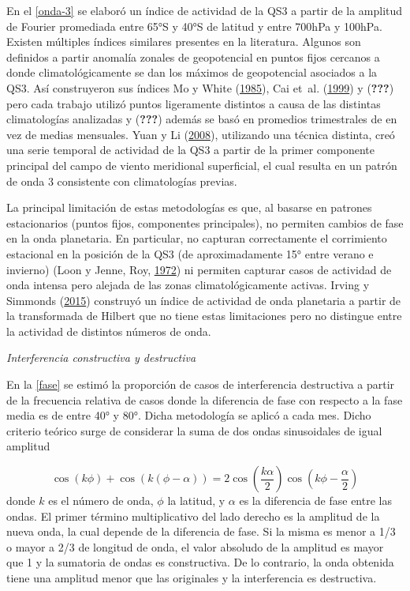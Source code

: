 \documentclass[spanish,a4paper,12pt]{book}
\begin{document}
En el \autoref{onda-3} se elaboró un índice de actividad de la QS3 a
partir de la amplitud de Fourier promediada entre 65°S y 40°S de latitud
y entre 700hPa y 100hPa. Existen múltiples índices similares presentes
en la literatura. Algunos son definidos a partir anomalía zonales de
geopotencial en puntos fijos cercanos a donde climatológicamente se dan
los máximos de geopotencial asociados a la QS3. Así construyeron sus
índices Mo y White (\protect\hyperlink{ref-Mo1985}{1985}), Cai et~al.
(\protect\hyperlink{ref-Cai1999}{1999}) y ({\textbf{???}}) pero cada
trabajo utilizó puntos ligeramente distintos a causa de las distintas
climatologías analizadas y ({\textbf{???}}) además se basó en promedios
trimestrales de en vez de medias mensuales. Yuan y Li
(\protect\hyperlink{ref-Yuan2008}{2008}), utilizando una técnica
distinta, creó una serie temporal de actividad de la QS3 a partir de la
primer componente principal del campo de viento meridional superficial,
el cual resulta en un patrón de onda 3 consistente con climatologías
previas.

La principal limitación de estas metodologías es que, al basarse en
patrones estacionarios (puntos fijos, componentes principales), no
permiten cambios de fase en la onda planetaria. En particular, no
capturan correctamente el corrimiento estacional en la posición de la
QS3 (de aproximadamente 15° entre verano e invierno) (Loon y Jenne, Roy,
\protect\hyperlink{ref-Loon1972}{1972}) ni permiten capturar casos de
actividad de onda intensa pero alejada de las zonas climatológicamente
activas. Irving y Simmonds (\protect\hyperlink{ref-Irving2015}{2015})
construyó un índice de actividad de onda planetaria a partir de la
transformada de Hilbert que no tiene estas limitaciones pero no
distingue entre la actividad de distintos números de onda.

\emph{Interferencia constructiva y destructiva}

En la \autoref{fase} se estimó la proporción de casos de interferencia
destructiva a partir de la frecuencia relativa de casos donde la
diferencia de fase con respecto a la fase media es de entre 40° y 80°.
Dicha metodología se aplicó a cada mes. Dicho criterio teórico surge de
considerar la suma de dos ondas sinusoidales de igual amplitud

\[
\cos\left (k\phi \right) + \cos(k(\phi - \alpha)) = 2\cos\left( \frac{k\alpha}{2} \right)\cos\left( k\phi - \frac{\alpha}{2}\right) 
\] donde \(k\) es el número de onda, \(\phi\) la latitud, y \(\alpha\)
es la diferencia de fase entre las ondas. El primer término
multiplicativo del lado derecho es la amplitud de la nueva onda, la cual
depende de la diferencia de fase. Si la misma es menor a 1/3 o mayor a
2/3 de longitud de onda, el valor absoludo de la amplitud es mayor que 1
y la sumatoria de ondas es constructiva. De lo contrario, la onda
obtenida tiene una amplitud menor que las originales y la interferencia
es destructiva.
\end{document}
